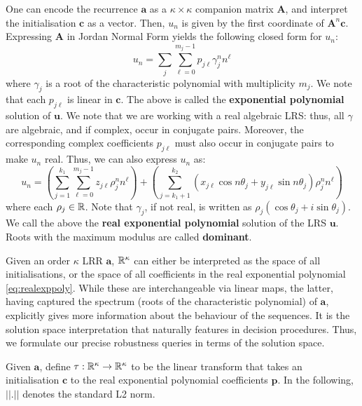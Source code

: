 One can encode the recurrence $\mathbf{a}$ as a $\kappa \times \kappa$ companion matrix $\mathbf{A}$, and interpret the initialisation $\mathbf{c}$ as a vector. Then, $u_n$ is given by the first coordinate of $\mathbf{A}^n\mathbf{c}$. Expressing $\mathbf{A}$ in Jordan Normal Form yields the following closed form for $u_n$:
\begin{equation}
\label{eq:exppoly}
u_n = \sum_{j}\sum_{\ell=0}^{m_j - 1}p_{j\ell}\gamma_j^n n^\ell
\end{equation}
where $\gamma_j$ is a root of the characteristic polynomial with multiplicity $m_j$. We note that each $p_{j\ell}$ is linear in $\mathbf{c}$. The above is called the \textbf{exponential polynomial} solution of $\mathbf{u}$. We note that we are working with a real algebraic LRS: thus, all $\gamma$ are algebraic, and if complex, occur in conjugate pairs. Moreover, the corresponding complex coefficients $p_{j\ell}$ must also occur in conjugate pairs to make $u_n$ real. Thus, we can also express $u_n$ as:
\begin{equation}
\label{eq:realexppoly}
u_n = \left(\sum_{j=1}^{k_1}\sum_{\ell = 0}^{m_j-1} z_{j\ell}\rho_j^n n^\ell\right) + \left(\sum_{j=k_1 + 1}^{k_2}  (x_{j\ell} \cos n\theta_j + y_{j\ell}\sin n\theta_j)\rho_j^n n^\ell\right)
\end{equation}
where each $\rho_j \in \mathbb{R}$. Note that $\gamma_j$, if not real, is written as $\rho_j(\cos \theta_j + i\sin \theta_j)$. We call the above the \textbf{real exponential polynomial} solution of the LRS $\mathbf{u}$. Roots with the maximum modulus are called \textbf{dominant}.

Given an order $\kappa$ LRR $\mathbf{a}$, $\mathbb{R}^\kappa$ can either be interpreted as the space of all initialisations, or the space of all coefficients in the real exponential polynomial \ref{eq:realexppoly}. While these are interchangeable via linear maps, the latter, having captured the spectrum (roots of the characteristic polynomial) of $\mathbf{a}$, explicitly gives more information about the behaviour of the sequences. It is the solution space interpretation that naturally features in decision procedures. Thus, we formulate our precise robustness queries in terms of the solution space. 

Given $\mathbf{a}$, define $\tau: \mathbb{R}^\kappa \rightarrow \mathbb{R}^\kappa$ to be the linear transform that takes an initialisation $\mathbf{c}$ to the real exponential polynomial coefficients $\mathbf{p}$. In the following, $||.||$ denotes the standard L2 norm.


